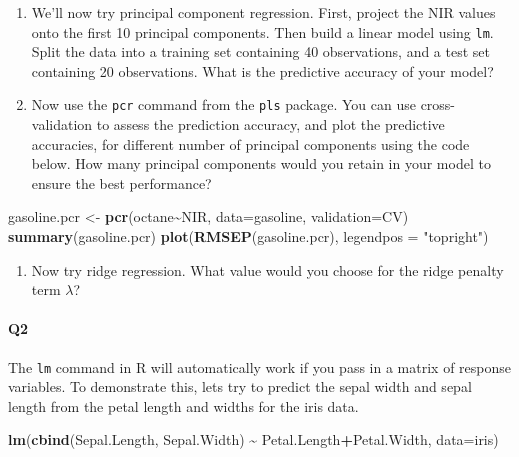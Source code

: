 \documentclass[
]{book}
\newenvironment{Shaded}{\begin{snugshade}}{\end{snugshade}}
\newcommand{\AttributeTok}[1]{\textcolor[rgb]{0.13,0.29,0.53}{#1}}
\newcommand{\FunctionTok}[1]{\textcolor[rgb]{0.13,0.29,0.53}{\textbf{#1}}}
\newcommand{\NormalTok}[1]{#1}
\newcommand{\OtherTok}[1]{\textcolor[rgb]{0.56,0.35,0.01}{#1}}
\newcommand{\SpecialCharTok}[1]{\textcolor[rgb]{0.81,0.36,0.00}{\textbf{#1}}}
\newcommand{\StringTok}[1]{\textcolor[rgb]{0.31,0.60,0.02}{#1}}
\providecommand{\tightlist}{%
  \setlength{\itemsep}{0pt}\setlength{\parskip}{0pt}}
\theoremstyle{definition}
\theoremstyle{definition}
\theoremstyle{definition}
\theoremstyle{definition}
\theoremstyle{remark}
\begin{document}
\begin{enumerate}
\def\labelenumi{\roman{enumi}.}
\setcounter{enumi}{1}
\item
  We'll now try principal component regression. First, project the NIR values onto the first 10 principal components. Then build a linear model using \texttt{lm}. Split the data into a training set containing 40 observations, and a test set containing 20 observations. What is the predictive accuracy of your model?
\item
  Now use the \texttt{pcr} command from the \texttt{pls} package. You can use cross-validation to assess the prediction accuracy, and plot the predictive accuracies, for different number of principal components using the code below.
  How many principal components would you retain in your model to ensure the best performance?
\end{enumerate}

\begin{Shaded}
\begin{Highlighting}[]
\NormalTok{gasoline.pcr }\OtherTok{\textless{}{-}} \FunctionTok{pcr}\NormalTok{(octane}\SpecialCharTok{\textasciitilde{}}\NormalTok{NIR, }\AttributeTok{data=}\NormalTok{gasoline, }\AttributeTok{validation=}\StringTok{\textquotesingle{}CV\textquotesingle{}}\NormalTok{)}
\FunctionTok{summary}\NormalTok{(gasoline.pcr)}
\FunctionTok{plot}\NormalTok{(}\FunctionTok{RMSEP}\NormalTok{(gasoline.pcr), }\AttributeTok{legendpos =} \StringTok{"topright"}\NormalTok{)}
\end{Highlighting}
\end{Shaded}

\begin{enumerate}
\def\labelenumi{\roman{enumi}.}
\setcounter{enumi}{3}
\tightlist
\item
  Now try ridge regression. What value would you choose for the ridge penalty term \(\lambda\)?
\end{enumerate}

\paragraph*{Q2}\label{q2-1}

The \texttt{lm} command in R will automatically work if you pass in a matrix of response variables. To demonstrate this, lets try to predict the sepal width and sepal length from the petal length and widths for the iris data.

\begin{Shaded}
\begin{Highlighting}[]
\FunctionTok{lm}\NormalTok{(}\FunctionTok{cbind}\NormalTok{(Sepal.Length, Sepal.Width) }\SpecialCharTok{\textasciitilde{}}\NormalTok{ Petal.Length}\SpecialCharTok{+}\NormalTok{Petal.Width,}
   \AttributeTok{data=}\NormalTok{iris)}
\end{Highlighting}
\end{Shaded}
\end{document}
